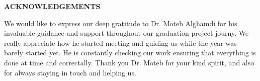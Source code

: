 \newpage

\setcounter{page}{2}
\renewcommand{\thepage}{\roman{page}}


\begin{center}
    \Large\textbf{ACKNOWLEDGEMENTS}
\end{center}
\vspace{6pt}

We would like to express our deep gratitude to Dr. Moteb Alghamdi for his invaluable guidance and support throughout our graduation project journy. We really appreciate how he started meeting and guiding us while the year was barely started yet. He is constantly checking our work ensuring that everything is done at time and correctally. Thank you Dr. Moteb for your kind spirit, and also for always staying in touch and helping us.
